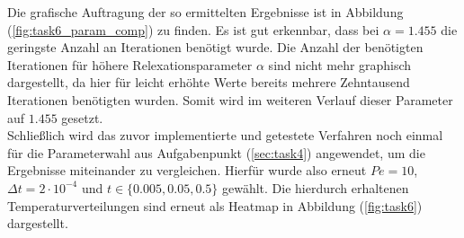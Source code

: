 \documentclass[12pt,a4paper,titlepage,headinclude,bibtotoc]{scrartcl}
\begin{document}
\noindent\begin{minipage}[t]{0.40\textwidth}%
\vspace{1cm}
Die grafische Auftragung der so ermittelten Ergebnisse ist in Abbildung (\ref{fig:task6_param_comp}) zu finden. Es ist gut erkennbar, dass bei $\alpha=1.455$ die geringste Anzahl an Iterationen benötigt wurde. Die Anzahl der benötigten Iterationen für höhere Relexationsparameter $\alpha$ sind nicht mehr graphisch dargestellt, da hier für leicht erhöhte Werte bereits mehrere Zehntausend Iterationen benötigten wurden. Somit wird im weiteren Verlauf dieser Parameter auf $1.455$ gesetzt.\\
Schließlich wird das zuvor implementierte und getestete Verfahren noch einmal für die Parameterwahl aus Aufgabenpunkt (\ref{sec:task4}) angewendet, um die Ergebnisse miteinander zu vergleichen. Hierfür wurde also erneut $Pe = 10$, $\Delta t = 2 \cdot 10^{-4}$ und $t \in \{0.005, 0.05, 0.5\}$ gewählt. Die hierdurch erhaltenen Temperaturverteilungen sind erneut als Heatmap in Abbildung (\ref{fig:task6}) dargestellt.
\end{minipage}%
\hfill%
\end{document}
